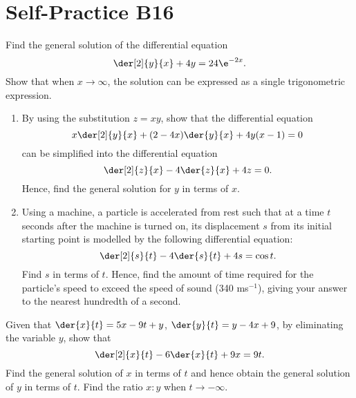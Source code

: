\section{Self-Practice B16}

\begin{problem}
    Find the general solution of the differential equation \[\der[2]{y}{x} + 4y = 24\e^{-2x}.\] Show that when $x \to \infty$, the solution can be expressed as a single trigonometric expression.
\end{problem}

\begin{problem}
    \begin{enumerate}
        \item By using the substitution $z = xy$, show that the differential equation \[x\der[2]{y}{x} + (2-4x)\der{y}{x} + 4y(x-1) = 0\] can be simplified into the differential equation \[\der[2]{z}{x} - 4\der{z}{x} + 4z = 0.\] Hence, find the general solution for $y$ in terms of $x$.
        \item Using a machine, a particle is accelerated from rest such that at a time $t$ seconds after the machine is turned on, its displacement $s$ from its initial starting point is modelled by the following differential equation: \[\der[2]{s}{t} -4 \der{s}{t} + 4s = \cos t.\] Find $s$ in terms of $t$. Hence, find the amount of time required for the particle's speed to exceed the speed of sound (340 ms$^{-1}$), giving your answer to the nearest hundredth of a second.
    \end{enumerate}
\end{problem}

\begin{problem}
    Given that $\der{x}{t} = 5x - 9t + y$, $\der{y}{t} = y - 4x + 9$, by eliminating the variable $y$, show that \[\der[2]{x}{t} - 6\der{x}{t}+ 9x = 9t.\] Find the general solution of $x$ in terms of $t$ and hence obtain the general solution of $y$ in terms of $t$. Find the ratio $x:y$ when $t \to -\infty$.
\end{problem}


